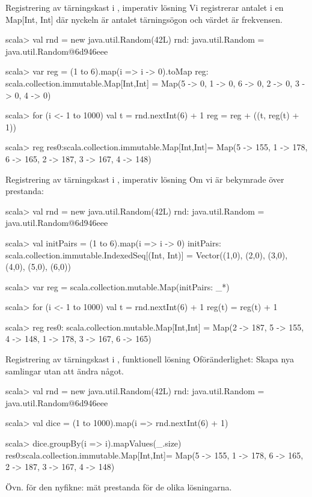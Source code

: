 \begin{Slide}{Registrering av tärningskast i , imperativ lösning}
Vi registrerar antalet i en Map[Int, Int] där nyckeln är antalet tärningsögon och värdet är frekvensen.
\begin{REPLnonum}
scala> val rnd = new java.util.Random(42L)
rnd: java.util.Random = java.util.Random@6d946eee

scala> var reg = (1 to 6).map(i => i -> 0).toMap
reg: scala.collection.immutable.Map[Int,Int] = 
  Map(5 -> 0, 1 -> 0, 6 -> 0, 2 -> 0, 3 -> 0, 4 -> 0)

scala> for (i <- 1 to 1000) {
         val t = rnd.nextInt(6) + 1
         reg = reg + ((t, reg(t) + 1))
       }
       
scala> reg
res0:scala.collection.immutable.Map[Int,Int]= Map(5 -> 155, 
1 -> 178, 6 -> 165, 2 -> 187, 3 -> 167, 4 -> 148)
\end{REPLnonum}
\end{Slide}

\begin{Slide}{Registrering av tärningskast i , imperativ lösning}
Om vi är bekymrade över prestanda:
\begin{REPL}
scala> val rnd = new java.util.Random(42L)
rnd: java.util.Random = java.util.Random@6d946eee

scala> val initPairs = (1 to 6).map(i => i -> 0)
initPairs: scala.collection.immutable.IndexedSeq[(Int, Int)] = 
Vector((1,0), (2,0), (3,0), (4,0), (5,0), (6,0))

scala> var reg = scala.collection.mutable.Map(initPairs: _*)

scala> for (i <- 1 to 1000) {
         val t = rnd.nextInt(6) + 1
         reg(t) = reg(t) + 1
       }
       
scala> reg
res0: scala.collection.mutable.Map[Int,Int] = 
Map(2 -> 187, 5 -> 155, 4 -> 148, 1 -> 178, 3 -> 167, 6 -> 165)

\end{REPL}
\end{Slide}

\begin{Slide}{Registrering av tärningskast i , funktionell lösning}
Oföränderlighet: Skapa nya samlingar utan att ändra något.
\begin{REPLnonum}
scala> val rnd = new java.util.Random(42L)
rnd: java.util.Random = java.util.Random@6d946eee

scala> val dice = (1 to 1000).map(i => rnd.nextInt(6) + 1)

scala> dice.groupBy(i => i).mapValues(_.size)
res0:scala.collection.immutable.Map[Int,Int]= Map(5 -> 155, 
1 -> 178, 6 -> 165, 2 -> 187, 3 -> 167, 4 -> 148)
\end{REPLnonum}
Övn. för den nyfikne: mät prestanda för de olika lösningarna.
\end{Slide}

